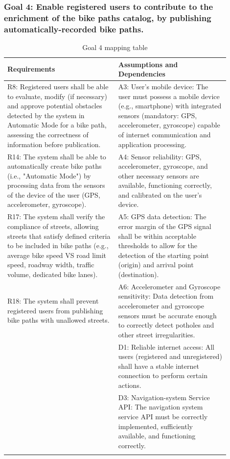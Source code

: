 \documentclass{Configuration_Files/PoliMi3i_thesis}
\begin{document}
    \subsubsection*{Goal 4: Enable registered users to contribute to the enrichment of the bike paths catalog, by publishing automatically-recorded bike paths.}
    \begin{longtable}{|p{0.45\linewidth}|p{0.45\linewidth}|}
    \hline
    \textbf{Requirements} & \textbf{Assumptions and Dependencies} \\ \hline
    R8: Registered users shall be able to evaluate, modify (if necessary) and approve potential obstacles detected by the system in Automatic Mode for a bike path, assessing the correctness of information before publication.&A3: User’s mobile device: The user must possess a mobile device (e.g., smartphone) with integrated sensors (mandatory: GPS, accelerometer, gyroscope) capable of internet communication and application processing.\\
    R14: The system shall be able to automatically create bike paths (i.e., "Automatic Mode") by processing data from the sensors of the device of the user (GPS, accelerometer, gyroscope).&A4: Sensor reliability: GPS, accelerometer, gyroscope, and other necessary sensors are available, functioning correctly, and calibrated on the user's device.\\
    R17: The system shall verify the compliance of streets, allowing streets that satisfy defined criteria to be included in bike paths (e.g., average bike speed VS road limit speed, roadway width, traffic volume, dedicated bike lanes).&A5: GPS data detection: The error margin of the GPS signal shall be within acceptable thresholds to allow for the detection of the starting point (origin) and arrival point (destination).\\
    R18: The system shall prevent registered users from publishing bike paths with unallowed streets.&A6: Accelerometer and Gyroscope sensitivity: Data detection from accelerometer and gyroscope sensors must be accurate enough to correctly detect potholes and other street irregularities.\\
    &D1: Reliable internet access: All users (registered and unregistered) shall have a stable internet connection to perform certain actions.\\
    &D3: Navigation-system Service API: The navigation system service API must be correctly implemented, sufficiently available, and functioning correctly.\\
    \hline
    \caption{Goal 4 mapping table}
    \end{longtable}
    
\end{document}
